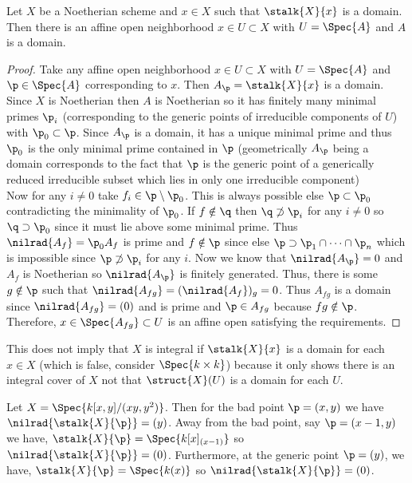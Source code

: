\documentclass[12pt]{article}
\begin{document}
\begin{lemma} \label{open_domain}
Let $X$ be a Noetherian scheme and $x \in X$ such that $\stalk{X}{x}$ is a domain. Then there is an affine open neighborhood $x \in U \subset X$ with $U = \Spec{A}$ and $A$ is a domain.
\end{lemma}

\begin{proof}
Take any affine open neighborhood $x \in U \subset X$ with $U = \Spec{A}$ and $\p \in \Spec{A}$ corresponding to $x$. Then $A_\p = \stalk{X}{x}$ is a domain. Since $X$ is Noetherian then $A$ is Noetherian so it has finitely many minimal primes $\p_i$ (corresponding to the generic points of irreducible components of $U$) with $\p_0 \subset \p$. Since $A_\p$ is a domain, it has a unique minimal prime and thus $\p_0$ is the only minimal prime contained in $\p$ (geometrically $A_\p$ being a domain corresponds to the fact that $\p$ is the generic point of a generically reduced irreducible subset which lies in only one irreducible component)
\bigskip\\
Now for any $i \neq 0$ take $f_i \in \p \setminus \p_0$. This is always possible else $\p \subset \p_0$ contradicting the minimality of $\p_0$. If $f \notin \q$ then $\q \not\supset \p_i$ for any $i \neq 0$ so $\q \supset \p_0$ since it must lie above some minimal prime. Thus $\nilrad{A_f} = \p_0 A_f$ is prime and $f \notin \p$ since else $\p \supset \p_1 \cap \cdots \cap \p_n$ which is impossible since $\p \not\supset \p_i$ for any $i$. Now we know that $\nilrad{A_\p} = 0$ and $A_f$ is Noetherian so $\nilrad{A_\p}$ is finitely generated. Thus, there is some $g \notin \p$ such that $\nilrad{A_{fg}} = (\nilrad{A_f})_g = 0$. Thus $A_{fg}$ is a domain since $\nilrad{A_{fg}} = (0)$ and is prime and $\p \in A_{fg}$ because $fg \notin \p$. Therefore, $x \in \Spec{A_{fg}} \subset U$ is an affine open satisfying the requirements. 
\end{proof}

\begin{rmk}
This does not imply that $X$ is integral if $\stalk{X}{x}$ is a domain for each $x \in X$ (which is false, consider $\Spec{k \times k}$) because it only shows there is an integral cover of $X$ not that $\struct{X}(U)$ is a domain for each $U$. 
\end{rmk}

\begin{example}
Let $X = \Spec{k[x,y]/(xy, y^2)}$. Then for the bad point $\p = (x, y)$ we have $\nilrad{\stalk{X}{\p}} = (y)$. Away from the bad point, say $\p = (x - 1, y)$ we have, $\stalk{X}{\p} = \Spec{k[x]_{(x-1)}}$ so $\nilrad{\stalk{X}{\p}} = (0)$. Furthermore, at the generic point $\p = (y)$, we have, $\stalk{X}{\p} = \Spec{k(x)}$ so $\nilrad{\stalk{X}{\p}} = (0)$. 
\end{example}
\end{document}
